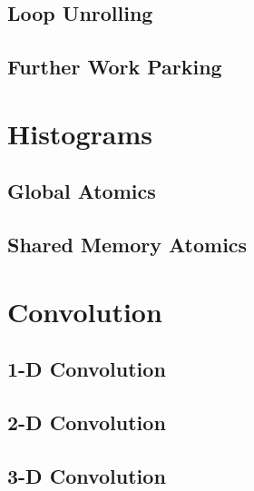 \documentclass[11pt,fancy,authoryear]{elegantbook}
\begin{document}
\section{Loop Unrolling}

\section{Further Work Parking}

\chapter{Histograms}

\section{Global Atomics}

\section{Shared Memory Atomics}

\chapter{Convolution}

\section{1-D Convolution}

\section{2-D Convolution}

\section{3-D Convolution}
\end{document}
